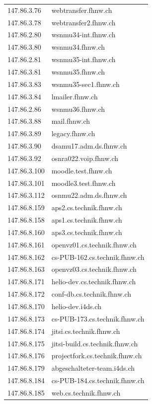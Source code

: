 \documentclass[11pt,a4paper]{scrartcl}
\begin{document}
\begin{longtable}{p{2.5cm}|p{7cm}}
	147.86.3.76 & webtransfer.fhnw.ch \\
	147.86.3.78 & webtransfer2.fhnw.ch \\
	147.86.2.80 & wsnmu34-int.fhnw.ch \\
	147.86.3.80 & wsnmu34.fhnw.ch \\
	147.86.2.81 & wsnmu35-int.fhnw.ch \\
	147.86.3.81 & wsnmu35.fhnw.ch \\
	147.86.3.83 & wsnmu35-sec1.fhnw.ch \\
	147.86.3.84 & lmailer.fhnw.ch \\
	147.86.2.86 & wsnmu36.fhnw.ch \\
	147.86.3.88 & mail.fhnw.ch \\
	147.86.3.89 & legacy.fhnw.ch \\
	147.86.3.90 & dsamu17.adm.ds.fhnw.ch \\
	147.86.3.92 & osnra022.voip.fhnw.ch \\
	147.86.3.100 & moodle.test.fhnw.ch \\
	147.86.3.101 & moodle3.test.fhnw.ch \\
	147.86.3.112 & osnmu22.adm.ds.fhnw.ch \\
	147.86.8.159 & aps2.cs.technik.fhnw.ch \\
	147.86.8.158 & aps1.cs.technik.fhnw.ch \\
	147.86.8.160 & aps3.cs.technik.fhnw.ch \\
	147.86.8.161 & openvz01.cs.technik.fhnw.ch \\
	147.86.8.162 & cs-PUB-162.cs.technik.fhnw.ch \\
	147.86.8.163 & openvz03.cs.technik.fhnw.ch \\
	147.86.8.171 & helio-dev.cs.technik.fhnw.ch \\
	147.86.8.172 & conf-db.cs.technik.fhnw.ch \\
	147.86.8.170 & helio-dev.i4ds.ch \\
	147.86.8.173 & cs-PUB-173.cs.technik.fhnw.ch \\
	147.86.8.174 & jitsi.cs.technik.fhnw.ch \\
	147.86.8.175 & jitsi-build.cs.technik.fhnw.ch \\
	147.86.8.176 & projectfork.cs.technik.fhnw.ch \\
	147.86.8.179 & abgeschalteter-team.i4ds.ch \\
	147.86.8.184 & cs-PUB-184.cs.technik.fhnw.ch \\
	147.86.8.185 & web.cs.technik.fhnw.ch \\

\end{longtable}
\end{document}
